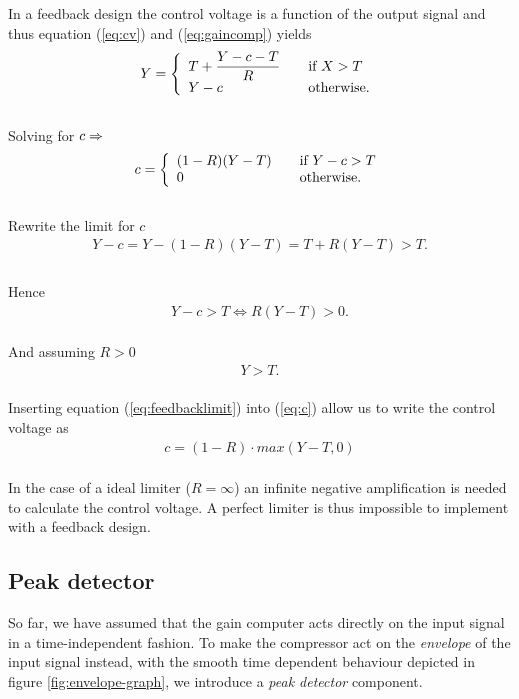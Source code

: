 \documentclass[]{article}
\begin{document}
In a feedback design the control voltage is a function of the output signal and thus equation (\ref{eq:cv}) and (\ref{eq:gaincomp}) yields
\begin{equation}
Y = \left\{ 
  \begin{array}{l l}
    T+ \dfrac{Y-c-T}{R} & \quad \text{if $X > T$}\\
    Y-c & \quad \text{otherwise.}
  \end{array} \right.
\end{equation}
\\Solving for $c \rm \Rightarrow$
\begin{equation} \label{eq:c}
c = \left\{ 
  \begin{array}{l l}
    (1-R)(Y-T)& \quad \text{if $Y-c > T$}\\
    0 & \quad \text{otherwise.}
  \end{array} \right.
\end{equation}
\\Rewrite the limit for $c$
\begin{align*}
Y - c  = Y-(1-R)(Y-T) = T + R(Y-T) > T.   \\
\end{align*}
\\Hence 
\begin{align*}
Y-c > T \Longleftrightarrow R(Y-T)  > 0.
\end{align*}
\\And assuming $R > 0$
\begin{align} \label{eq:feedbacklimit}
Y > T.
\end{align}
\\Inserting equation (\ref{eq:feedbacklimit}) into (\ref{eq:c}) allow us to write the control voltage as
\begin{align}
c = (1-R)\cdot max\left(Y-T,0\right)
\end{align}
\\In the case of a ideal limiter ($R = \infty$) an infinite negative amplification is needed to calculate the control voltage. A perfect limiter is thus impossible to implement with a feedback design.

\subsection{Peak detector}
So far, we have assumed that the gain computer acts directly on the input signal in a time-independent fashion. To make the compressor act on the \emph{envelope} of the input signal instead, with the smooth time dependent behaviour depicted in figure \ref{fig:envelope-graph}, we introduce a \emph{peak detector} component.
\end{document}

